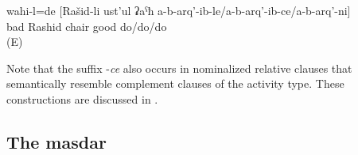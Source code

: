 \begin{exe}
	\ex	\label{ex:It was bad that Rashid did not repair the chair}
	\gll	wahi-l=de [Rašid-li ust'ul ʡaˁħ a-b-arq'-ib-le\slash a-b-arq'-ib-ce\slash a-b-arq'-ni]\\
		bad Rashid chair good do\slash{}do\slash{}do\\
	\glt	{} (E)
\end{exe}

Note that the suffix -\textit{ce} also occurs in nominalized relative clauses that semantically resemble complement clauses of the activity type. These constructions are discussed in .


\subsection{The masdar}
\label{ssec:The masdarComplementation}

